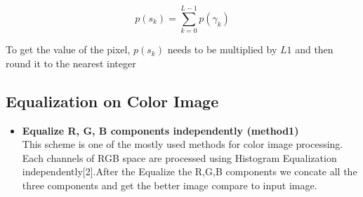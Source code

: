 \begin{equation}
	p(s_{k})=\sum_{k=0}^{L-1}p(\gamma_{k})
\end{equation}

To get the value of the pixel, $p(s_{k})$ needs to be multiplied by $L1$ and then round
it to the nearest integer

\subsection{Equalization on Color Image}
\begin{itemize}
	\item \textbf{Equalize R, G, B components independently (method1)}\\
			This scheme is one of the mostly used methods for color image processing.
			Each channels of RGB space are processed using Histogram Equalization
			independently[2].After the Equalize the R,G,B components we concate all the three
			components and get the better image compare to input image.


\end{itemize}
